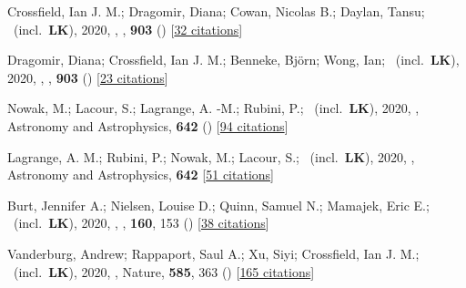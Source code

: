 \item[{\color{numcolor}\scriptsize45}] Crossfield, Ian J. M.; Dragomir, Diana; Cowan, Nicolas B.; Daylan, Tansu; \etal\ (incl.\ \textbf{LK}), 2020, , \apj, \textbf{903} () [\href{https://ui.adsabs.harvard.edu/abs/2020ApJ...903L...7C}{32 citations}]

\item[{\color{numcolor}\scriptsize44}] Dragomir, Diana; Crossfield, Ian J. M.; Benneke, Bj{\"o}rn; Wong, Ian; \etal\ (incl.\ \textbf{LK}), 2020, , \apj, \textbf{903} () [\href{https://ui.adsabs.harvard.edu/abs/2020ApJ...903L...6D}{23 citations}]

\item[{\color{numcolor}\scriptsize43}] Nowak, M.; Lacour, S.; Lagrange, A. -M.; Rubini, P.; \etal\ (incl.\ \textbf{LK}), 2020, , Astronomy and Astrophysics, \textbf{642} () [\href{https://ui.adsabs.harvard.edu/abs/2020A&A...642L...2N}{94 citations}]

\item[{\color{numcolor}\scriptsize42}] Lagrange, A. M.; Rubini, P.; Nowak, M.; Lacour, S.; \etal\ (incl.\ \textbf{LK}), 2020, , Astronomy and Astrophysics, \textbf{642} [\href{https://ui.adsabs.harvard.edu/abs/2020A&A...642A..18L}{51 citations}]

\item[{\color{numcolor}\scriptsize41}] Burt, Jennifer A.; Nielsen, Louise D.; Quinn, Samuel N.; Mamajek, Eric E.; \etal\ (incl.\ \textbf{LK}), 2020, , \aj, \textbf{160}, 153 () [\href{https://ui.adsabs.harvard.edu/abs/2020AJ....160..153B}{38 citations}]

\item[{\color{numcolor}\scriptsize40}] Vanderburg, Andrew; Rappaport, Saul A.; Xu, Siyi; Crossfield, Ian J. M.; \etal\ (incl.\ \textbf{LK}), 2020, , Nature, \textbf{585}, 363 () [\href{https://ui.adsabs.harvard.edu/abs/2020Natur.585..363V}{165 citations}]


